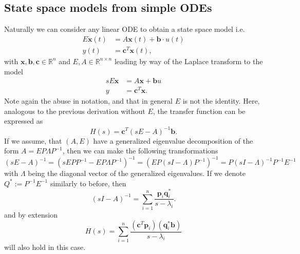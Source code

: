 \documentclass{article}
\begin{document}
	\subsection{State space models from simple ODEs}
	Naturally we can consider any linear ODE to obtain a state space model i.e.
	\begin{equation}\label{eq:simpleODE}
		\begin{aligned}
			E\dot{\mathbf{x}}(t)&=A\mathbf{x}(t)+\mathbf{b}\cdot u(t)\\
			y(t)&=\mathbf{c}^{T}\mathbf{x}(t),
		\end{aligned}
	\end{equation}
	with $\mathbf{x},\mathbf{b},\mathbf{c}\in\mathbb{R}^{n}$ and $E,A\in\mathbb{R}^{n\times n}$ leading by way of the Laplace transform to the model
	\begin{equation}\label{eq:SSmodelfromSimpleODE}
		\begin{aligned}
			sE\mathbf{x}&=A\mathbf{x}+\mathbf{b}u\\
			y&=\mathbf{c}^{T}\mathbf{x}.
		\end{aligned}
	\end{equation}
	Note again the abuse in notation, and that in general $E$ is not the identity.
	Here, analogous to the previous derivation without $E$, the transfer function can be expressed as 
	\begin{equation}
		H(s) = \textbf{c}^T \left(sE - A\right)^{-1} \textbf{b}.
	\end{equation}
	If we assume, that $(A, E)$ have a generalized eigenvalue decomposition of the form $A = E P \Lambda P^{-1}$, then we can make the following transformations
	\begin{equation}
		\left(sE - A\right)^{-1} = \left(sEP P^{-1}-EP\Lambda P^{-1}\right)^{-1} = \left(EP\left(s I -\Lambda\right) P^{-1}\right)^{-1} = P \left(s I -\Lambda\right)^{-1} P^{-1} E^{-1}
	\end{equation}
	with $\Lambda$ being the diagonal vector of the generalized eigenvalues. If we denote $Q^\ast := P^{-1}E^{-1} $ similarly to before, then 
	\begin{equation}
		(sI-A)^{-1}=\sum_{i=1}^{n}\frac{\mathbf{p}_i\mathbf{q}_i^{\ast}}{s-\lambda_i}.
	\end{equation}
	and by extension
	\begin{equation}
		H(s)
		=\sum_{i=1}^n \frac{(\mathbf{c}^T\mathbf{p}_i)(\mathbf{q}_i^{\ast}\mathbf{b})}{s-\lambda_i}
	\end{equation}
	will also hold in this case.
	
\end{document}
